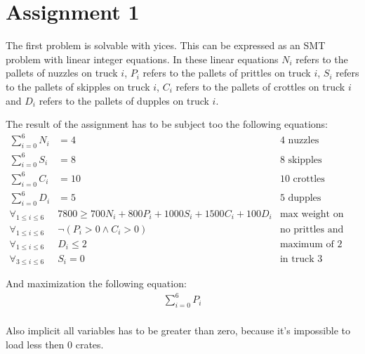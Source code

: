 \chapter{Assignment 1}
The first problem is solvable with yices. This can be expressed as an SMT problem with linear integer equations.  In these linear equations $N_i$ refers to the pallets of nuzzles on truck $i$, $P_i$ refers to the pallets of prittles on truck $i$, $S_i$ refers to the pallets of skipples on truck $i$, $C_i$ refers to the pallets of crottles on truck $i$ and $D_i$ refers to the pallets of dupples on truck $i$.

The result of the assignment has to be subject too the following equations:
\begin{align*} 
\sum_{i=0}^{6}N_i &= 4 &\text{4 nuzzles}\\ 
\sum_{i=0}^{6}S_i &= 8 &\text{8 skipples}\\ 
\sum_{i=0}^{6}C_i &= 10 &\text{10 crottles}\\ 
\sum_{i=0}^{6}D_i &= 5 &\text{5 dupples}\\
\forall_{1 \le i \le 6}\; &7800 \ge 700 N_i + 800 P_i + 1000 S_i + 1500 C_i + 100 D_i &\text{max weight on trucks}\\
\forall_{1 \le i \le 6}\; &\neg (P_i > 0 \land C_i > 0) &\text{no prittles and crottles together}\\
\forall_{1 \le i \le 6}\; &D_i \le 2 &\text{maximum of 2 dupples}\\
\forall_{3 \le i \le 6}\; &S_i = 0 &\text{in truck 3 through 6 no skipples}
\end{align*}

And maximization the following equation:
\begin{align*}
\sum_{i=0}^{6}P_i \\ 
\end{align*}

Also implicit all variables has to be greater than zero, because it's impossible to load less then 0 crates.

